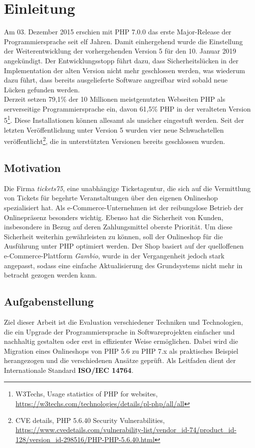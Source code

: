 \chapter{Einleitung}
Am 03. Dezember 2015 erschien mit PHP 7.0.0 das erste Major-Release der Programmiersprache seit elf Jahren. Damit einhergehend wurde die Einstellung der Weiterentwicklung der vorhergehenden Version
5 für den 10. Januar 2019 angekündigt. Der Entwicklungsstopp führt dazu, dass Sicherheitslücken in der Implementation der alten Version nicht mehr geschlossen werden, was 
wiederum dazu führt, dass bereits ausgelieferte Software angreifbar wird sobald neue Lücken gefunden werden. \\
Derzeit setzen 79,1\% der 10 Millionen meistgenutzten Webseiten PHP als serverseitige Programmiersprache ein, davon 61,5\% PHP in der veralteten Version 5\footnote{W3Techs, \glqq Usage statistics of PHP for websites\grqq , 
\url{https://w3techs.com/technologies/details/pl-php/all/all}}. Diese Installationen können allesamt als unsicher eingestuft werden. Seit der letzten Veröffentlichung 
unter Version 5 wurden vier neue Schwachstellen veröffentlicht\footnote{CVE details, \glqq PHP 5.6.40 Security Vulnerabilities\grqq , 
\url{https://www.cvedetails.com/vulnerability-list/vendor_id-74/product_id-128/version_id-298516/PHP-PHP-5.6.40.html}}, die in unterstützten Versionen bereits geschlossen 
wurden.

\section{Motivation}
Die Firma \textit{tickets75}, eine unabhängige Ticketagentur, die sich auf die Vermittlung von Tickets für begehrte 
Veranstaltungen über den eigenen Onlineshop spezialisiert hat. Als e-Commerce-Unternehmen ist der reibungslose Betrieb der 
Onlinepräsenz besonders wichtig. Ebenso hat die Sicherheit von Kunden, insbesondere in Bezug auf deren Zahlungsmittel oberste 
Priorität. Um diese Sicherheit weiterhin gewährleisten zu können, soll der Onlineshop für die Ausführung unter \ac{PHP} optimiert 
werden. Der Shop basiert auf der quelloffenen e-Commerce-Plattform \textit{Gambio}, wurde in der Vergangenheit jedoch stark 
angepasst, sodass eine einfache Aktualisierung des Grundsystems nicht mehr in betracht gezogen werden kann.

\section{Aufgabenstellung}
Ziel dieser Arbeit ist die Evaluation verschiedener Techniken und Technologien, die ein Upgrade der Programmiersprache in Softwareprojekten einfacher und nachhaltig gestalten 
oder erst in effizienter Weise ermöglichen. Dabei wird die Migration eines Onlineshops von PHP 5.6 zu PHP 7.x als praktisches Beispiel herangezogen und die verschiedenen 
Ansätze geprüft. Als Leitfaden dient der Internationale Standard \textbf{ISO/IEC 14764}.

